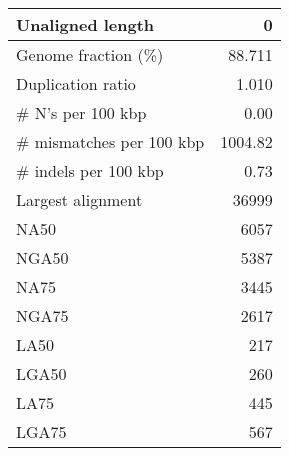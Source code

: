 \documentclass[12pt,a4paper]{article}
\begin{document}
\begin{table}[ht]
\begin{center}
\begin{tabular}{|l*{1}{|r}|}
Unaligned length & 0 \\ \hline
Genome fraction (\%) & 88.711 \\ \hline
Duplication ratio & 1.010 \\ \hline
\# N's per 100 kbp & 0.00 \\ \hline
\# mismatches per 100 kbp & 1004.82 \\ \hline
\# indels per 100 kbp & 0.73 \\ \hline
Largest alignment & 36999 \\ \hline
NA50 & 6057 \\ \hline
NGA50 & 5387 \\ \hline
NA75 & 3445 \\ \hline
NGA75 & 2617 \\ \hline
LA50 & 217 \\ \hline
LGA50 & 260 \\ \hline
LA75 & 445 \\ \hline
LGA75 & 567 \\ \hline
\end{tabular}
\end{center}
\end{table}
\end{document}
